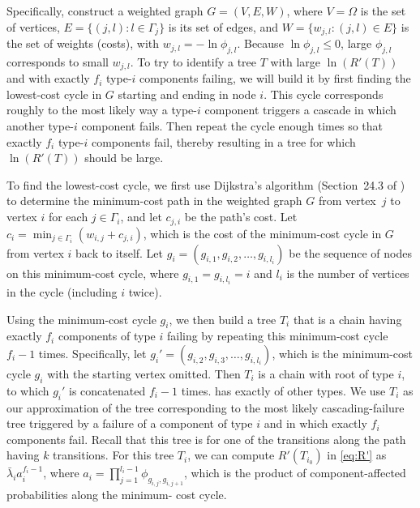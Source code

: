 \documentclass[12pt]{article}
\newcommand{\changed}[1]{#1}
\newcommand{\changed}[1]{\textcolor{red}{#1}}
\begin{document}
\changed{ Specifically, construct a weighted graph $G = (V,E,W)$, where $V =
\Omega$ is the set of vertices, $E = \{ (j,l) : l \in \Gamma_j \}$ is its set
of edges, and $W = \{ w_{j,l} : (j,l) \in E \}$ is the set of weights (costs),
with $w_{j,l} = -\ln \phi_{j,l}$. Because $\ln \phi_{j,l} \leq 0$, large
$\phi_{j,l}$ corresponds to small $w_{j,l}$. To try to identify a tree $T$
with large $\ln(R'(T))$ and with exactly $f_i$ type-$i$ components failing, we
will build it by first finding the lowest-cost cycle in $G$ starting and
ending in node $i$. This cycle corresponds roughly to the most likely way a
type-$i$ component triggers a cascade in which another type-$i$ component
fails. Then repeat the cycle enough times so that exactly $f_{i}$ type-$i$
components fail, thereby resulting in a tree for which $\ln(R'(T))$ should be
large. }

\changed{
To find the lowest-cost cycle, we first use Dijkstra's algorithm (Section~24.3
of \cite{CLRS:2001}) to determine the minimum-cost path in the weighted graph
$G$ from vertex~$j$ to vertex $i$ for each $j \in \Gamma_i$, and let $c_{j,i}$
be the path's cost. Let $c_{i} = \min_{j \in \Gamma_{i}} (w_{i,j} + c_{j,i})$,
which is the cost of the minimum-cost cycle in $G$ from vertex $i$ back to
itself. Let $g_{i} = (g_{i,1}, g_{i,2},
\dots, g_{i,l_{i}})$ be the sequence of
nodes on this minimum-cost cycle, where $g_{i,1} = g_{i,l_{i}} = i$ and
$l_{i}$ is the number of vertices in the cycle (including $i$ twice).}

\changed{ Using the minimum-cost cycle $g_{i}$, we then build a tree $T_{i}$
that is a chain having exactly $f_{i}$ components of type $i$ failing by
repeating this minimum-cost cycle $f_{i} - 1$ times. Specifically, let $g_{i}'
= (g_{i,2}, g_{i,3}, \ldots, g_{i,l_{i}})$, which is the minimum-cost cycle
$g_{i}$ with the starting vertex omitted. Then $T_{i}$ is a chain with root of
type $i$, to which $g_{i}'$ is concatenated $f_{i} - 1$ times. %
has exactly %
of other types. We use $T_{i}$ as our approximation of the tree corresponding
to the most likely cascading-failure tree triggered by a failure of a
component of type $i$ and in which exactly $f_{i}$ components fail. Recall
that this tree is for one of the transitions along the path having $k$
transitions. For this tree $T_{i}$, we can compute $R'(T_{i_0})$ in
\eqref{eq:R'} as $\bar{\lambda}_i
a_i^{f_i-1}$, where $a_i = \prod_{j=1}^{l_i-1}
\phi_{g_{i,j}, g_{i,j+1}}$,
which is the product of component-affected probabilities along the minimum-
cost cycle. }
\end{document}
